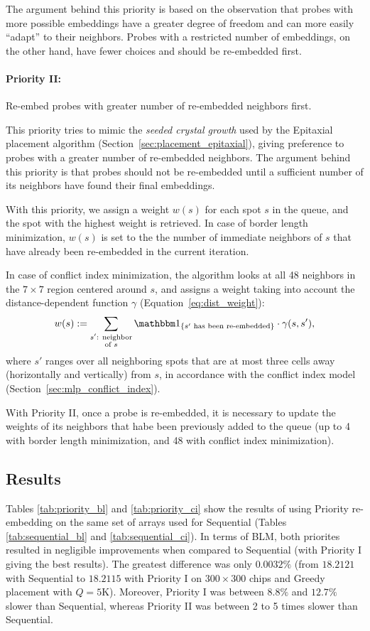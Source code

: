 The argument behind this priority is based on the observation that probes with
more possible embeddings have a greater degree of freedom and can more easily
``adapt'' to their neighbors. Probes with a restricted number of embeddings, on
the other hand, have fewer choices and should be re-embedded first.

\paragraph{Priority II:} Re-embed probes with greater number of re-embedded
neighbors first.

This priority tries to mimic the \emph{seeded crystal growth} used by the
Epitaxial placement algorithm (Section~\ref{sec:placement_epitaxial}), giving
preference to probes with a greater number of re-embedded neighbors. The
argument behind this priority is that probes should not be re-embedded until a
sufficient number of its neighbors have found their final embeddings.

With this priority, we assign a weight $w(s)$ for each spot $s$ in the queue,
and the spot with the highest weight is retrieved. In case of border length
minimization, $w(s)$ is set to the the number of immediate neighbors of $s$ that
have already been re-embedded in the current iteration.

In case of conflict index minimization, the algorithm looks at all 48 neighbors
in the $7\times 7$ region centered around $s$, and assigns a weight taking into
account the distance-dependent function $\gamma$
(Equation~\ref{eq:dist_weight}):
\[
w(s) := \sum_{\substack{s'\text{: neighbor}\\\text{of } s}}
        \Ind{s'\text{ has been re-embedded}}
        \cdot \gamma(s,s'),
\]
where $s'$ ranges over all neighboring spots that are at most three cells away
(horizontally and vertically) from $s$, in accordance with the conflict index
model (Section~\ref{sec:mlp_conflict_index}).

With Priority II, once a probe is re-embedded, it is necessary to update the
weights of its neighbors that habe been previously added to the queue (up to 4
with border length minimization, and 48 with conflict index minimization).

\subsection{Results}

Tables \ref{tab:priority_bl} and \ref{tab:priority_ci} show the results of
using Priority re-embedding on the same set of arrays used for Sequential
(Tables \ref{tab:sequential_bl} and \ref{tab:sequential_ci}). In terms of BLM,
both priorites resulted in negligible improvements when compared to Sequential
(with Priority I giving the best results). The greatest difference was only
$0.0032\%$ (from $18.2121$ with Sequential to $18.2115$ with Priority I on
$300\times 300$ chips and Greedy placement with $Q=5$K). Moreover, Priority I
was between $8.8\%$ and $12.7\%$ slower than Sequential, whereas Priority II was
between 2 to 5 times slower than Sequential.

